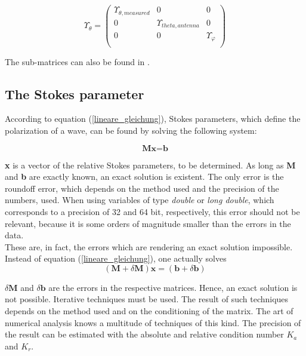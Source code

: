\documentclass[a4paper,14pt]{extbook}
\begin{document}
\begin{equation}\label{var-covar-matr_theta_simpli2}
\Upsilon_\theta=\left(%
\begin{array}{ccc}
  \Upsilon_{\theta,measured} & 0 &0 \\
0 & \Upsilon_{theta,antenna} & 0\\
0 & 0 & \Upsilon_\varphi\\
\end{array}%
\right)
\end{equation}

The sub-matrices can also be found in \cite{antenna_report_1}.

\subsection{The Stokes parameter}
According to equation (\ref{lineare_gleichung}), Stokes parameters, which define the polarization of a wave, can be found by solving the following system:

\begin{equation}
\textbf{M}\textbf{x}=\textbf{b}\nonumber
\end{equation}

\textbf{x} is a vector of the relative Stokes parameters, to be determined. As long as \textbf{M} and \textbf{b} are exactly known, an exact solution is existent. The only error is the roundoff error, which depends on the method used and the precision of the numbers, used. When using variables of type \textit{double} or \textit{long double}, which corresponds to a precision of 32 and 64 bit, respectively, this error should not be relevant, because it is some orders of magnitude smaller than the errors in the data.\\

These are, in fact, the errors which are rendering an exact solution impossible. Instead of equation (\ref{lineare_gleichung}), one actually solves\\

\begin{equation}\label{lineare_gleichung_mit_error}
(\textbf{M}+\delta \textbf{M})\textbf{x}=(\textbf{b}+\delta \textbf{b})
\end{equation}

$\delta \textbf{M}$ and $\delta \textbf{b}$ are the errors in the respective matrices. Hence, an exact solution is not possible. Iterative techniques must be used. The result of such techniques depends on the method used and on the conditioning of the matrix. The art of numerical analysis knows a multitude of techniques of this kind. The precision of the result can be estimated with the absolute and relative condition number $K_a$ and $K_r$.
\end{document}
